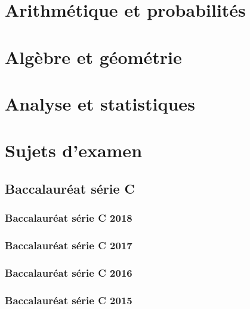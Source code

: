 
\hypersetup{pageanchor=true}
\TCDMainLayout
\tableofcontents
\mainmatter

\part{Arithmétique et probabilités}



\part{Algèbre et géométrie}






\part{Analyse et statistiques}








\part{Sujets d'examen}
\chapter{Baccalauréat série C}
\section{Baccalauréat série C 2018}

\newpage
\section{Baccalauréat série C 2017}

\newpage
\section{Baccalauréat série C 2016}

\newpage
\section{Baccalauréat série C 2015}

\newpage
